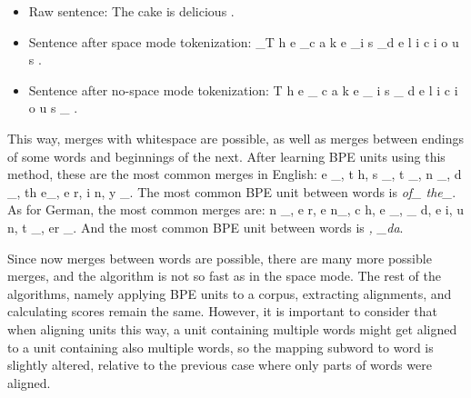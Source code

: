 \begin{itemize}
	\item Raw sentence: The cake is delicious .
	\item Sentence after space mode tokenization: \_T h e \_c a k e \_i s \_d e l i c i o u s .
	\item Sentence after no-space mode tokenization: T h e \_ c a k e \_ i s \_ d e l i c i o u s \_ .
\end{itemize}

This way, merges with whitespace are possible, as well as merges between endings of some words and beginnings of the next. After learning BPE units using this method, these are the most common merges in English: e \_, t h, s \_, t \_, n \_, d \_, th e\_, e r, i n, y \_. The most common BPE unit between words is \emph{of\_ the\_}. As for German, the most common merges are: n \_, e r, e n\_, c h, e \_, \_ d, e i, u n, t \_, er \_. And the most common BPE unit between words is \emph{, \_da}.

Since now merges between words are possible, there are many more possible merges, and the algorithm is not so fast as in the space mode. The rest of the algorithms, namely applying BPE units to a corpus, extracting alignments, and calculating scores remain the same. However, it is important to consider that when aligning units this way, a unit containing multiple words might get aligned to a unit containing also multiple words, so the mapping subword to word is slightly altered, relative to the previous case where only parts of words were aligned.
